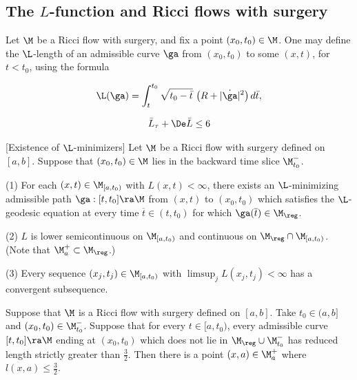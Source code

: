 \subsection{The $L$-function and Ricci flows with surgery}
\label{lfunctionandsurgerysection}

Let $\M$ be a Ricci flow with surgery,
and fix a point $(x_0,t_0)\in\M$.   One may
define the $\L$-length of an  admissible curve $\ga$ from
$(x_0,t_0)$ to some $(x,t)$, for $t<t_0$, using the formula

\begin{equation}
\L(\ga)=\int_t^{t_0}\sqrt{t_0-\bar t}\,\left(R+|\dot{\ga}|^2\right)d\bar t,
\end{equation}

\begin{equation} \label{newbarrier}
\bar L_\tau+\De \bar L\leq 6
\end{equation}

\begin{lemma}
  \label{lem:kl-reduced-l-geometry-existence-ricci-flow-surgery}
[Existence of $\L$-minimizers]
\label{minimizersexist}
Let $\M$ be a Ricci flow with surgery
defined on $ [a,b]$. Suppose that $(x_0,t_0)\in \M$ lies in the backward
time slice $\M_{t_0}^-$.

(1) For each $(x,t)\in \M_{[a,t_0)}$ with $L(x,t)<\infty$, there exists
an $\L$-minimizing admissible path $\ga:[t,t_0]\ra\M$ from $(x,t)$ to $(x_0,t_0)$
which satisfies the
$\L$-geodesic equation at every time $\overline{t}\in (t,t_0)$ for which
$\ga(\overline{t})\in\M_{\reg}$.


(2) $L$ is lower semicontinuous on
$\M_{[a,t_0)}$
and continuous
on
$\M_{\reg}\cap \M_{[a,t_0)}$. (Note that $\M_a^+ \subset \M_{\reg}$.)

(3) Every sequence $(x_j,t_j)\in \M_{[a,t_0)}$ with $\limsup_j L(x_j,t_j)<\infty$
has  a convergent subsequence.
\end{lemma}

\begin{lemma}
  \label{lem:kl-reduced-l-geometry-existence-reduced-length}

\label{stillleq3/2}
Suppose that $\M$ is a Ricci flow with surgery defined on $ [a,b]$.
Take
$t_0\in (a,b]$
and $(x_0,t_0)\in \M_{t_0}^-$.  Suppose that
for every $t \in [a, t_0)$, every admissible curve
$[t,t_0]\ra\M$ ending at $(x_0,t_0)$ which does not lie
in
$\M_{\reg}\cup  \M_{t_0}^-$
has reduced length strictly greater than $\frac{3}{2}$. Then
there is a point $(x,a)\in \M_a^+$ where $l(x,a)\leq \frac{3}{2}$.
\end{lemma}

